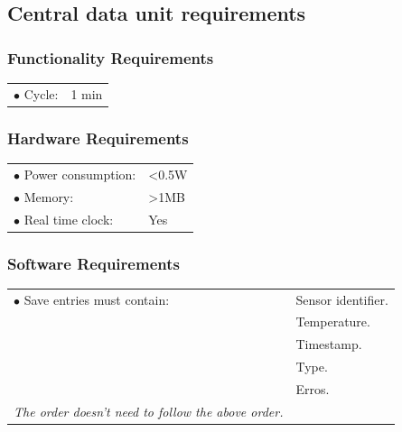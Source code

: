 \subsection{Central data unit requirements}

\subsubsection{Functionality Requirements}
\begin{table}[H]
\begin{tabular}{p{8cm} p{2cm}}
$\bullet$ Cycle\footnotemark: & 1 min\\
\end{tabular}
\end{table}
\subsubsection{Hardware Requirements}
\begin{table}[H]
\begin{tabular}{p{8cm} p{2cm}}
$\bullet$ Power consumption: & <0.5W \footnotemark \\
$\bullet$ Memory: & >1MB\footnotemark\\
$\bullet$ Real time clock: & Yes\\
\end{tabular}
\end{table}

\subsubsection{Software Requirements}
\begin{table}[H]
\begin{tabular}{p{8cm} p{5cm}}
$\bullet$ Save entries must contain: &Sensor identifier. \\
~ 									&Temperature. \\
~									&Timestamp. \\
~									&Type. \\
~									&Erros. \\
\textit{The order doesn't need to follow the above order.}

\end{tabular}
\end{table}


